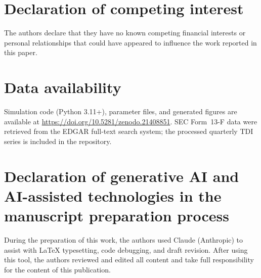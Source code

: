 \documentclass[preprint,12pt,authoryear]{elsarticle}
\begin{document}
\section*{Declaration of competing interest}

The authors declare that they have no known competing financial interests
or personal relationships that could have appeared to influence the work
reported in this paper.

\section*{Data availability}

Simulation code (Python 3.11+), parameter files, and generated figures
are available at \url{https://doi.org/10.5281/zenodo.21408851}.
SEC Form~13-F data were retrieved from the EDGAR full-text search system;
the processed quarterly TDI series is included in the repository.

\section*{Declaration of generative AI and AI-assisted technologies
          in the manuscript preparation process}

During the preparation of this work, the authors used Claude (Anthropic)
to assist with LaTeX typesetting, code debugging, and draft revision.
After using this tool, the authors reviewed and edited all content and
take full responsibility for the content of this publication.


\end{document}
